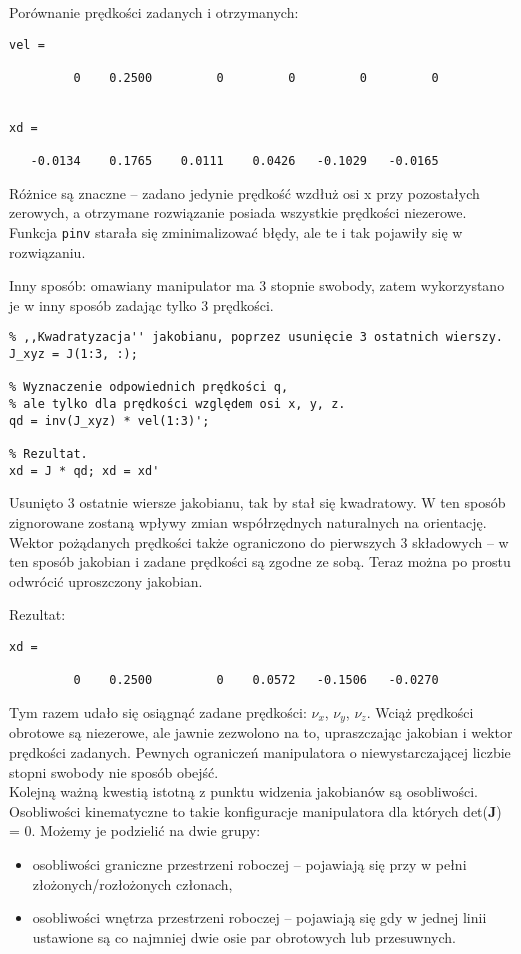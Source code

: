 \documentclass[11pt, a4paper]{article}
\begin{document}
Porównanie prędkości zadanych i otrzymanych:
\begin{lstlisting}[numbers = none]
vel =

         0    0.2500         0         0         0         0


xd =

   -0.0134    0.1765    0.0111    0.0426   -0.1029   -0.0165
\end{lstlisting}

Różnice są znaczne -- zadano jedynie prędkość wzdłuż osi x przy pozostałych zerowych, a otrzymane rozwiązanie posiada wszystkie prędkości niezerowe. Funkcja \texttt{pinv} starała się zminimalizować błędy, ale te i tak pojawiły się w rozwiązaniu.

Inny sposób: omawiany manipulator ma 3 stopnie swobody, zatem wykorzystano je w inny sposób zadając tylko 3 prędkości.
\begin{lstlisting}
% ,,Kwadratyzacja'' jakobianu, poprzez usunięcie 3 ostatnich wierszy.
J_xyz = J(1:3, :);

% Wyznaczenie odpowiednich prędkości q,
% ale tylko dla prędkości względem osi x, y, z.
qd = inv(J_xyz) * vel(1:3)';

% Rezultat.
xd = J * qd; xd = xd'
\end{lstlisting}

Usunięto 3 ostatnie wiersze jakobianu, tak by stał się kwadratowy. W ten sposób zignorowane zostaną wpływy zmian współrzędnych naturalnych na orientację. Wektor pożądanych prędkości także ograniczono do pierwszych 3 składowych -- w ten sposób jakobian i zadane prędkości są zgodne ze sobą. Teraz można po prostu odwrócić uproszczony jakobian.

Rezultat:
\begin{lstlisting}[numbers = none]
xd =

         0    0.2500         0    0.0572   -0.1506   -0.0270
\end{lstlisting}

Tym razem udało się osiągnąć zadane prędkości: $\nu_x$, $\nu_y$, $\nu_z$. Wciąż  prędkości obrotowe są niezerowe, ale jawnie zezwolono na to, upraszczając jakobian i wektor prędkości zadanych. Pewnych ograniczeń manipulatora o niewystarczającej liczbie stopni swobody nie sposób obejść.\\

Kolejną ważną kwestią istotną z punktu widzenia jakobianów są osobliwości. Osobliwości kinematyczne to takie konfiguracje manipulatora dla których det($\mathbf{J}$) = 0. Możemy je podzielić na dwie grupy:
\begin{itemize}
\item osobliwości graniczne przestrzeni roboczej -- pojawiają się przy w pełni złożonych/rozłożonych członach,
\item osobliwości wnętrza przestrzeni roboczej -- pojawiają się gdy w jednej linii ustawione są co najmniej dwie osie par obrotowych lub przesuwnych.
\end{itemize}
\end{document}
